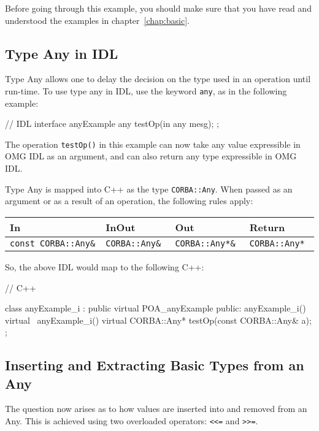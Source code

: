 \documentclass[11pt,oneside,a4paper]{book}
\newcommand{\type}[1]{\texttt{#1}}
\newcommand{\code}[1]{\texttt{#1}}
\newcommand{\op}[1]{\texttt{#1()}}
\begin{document}
Before going through this example, you should make sure that you have
read and understood the examples in chapter~\ref{chap:basic}.

\subsection{Type Any in IDL}
Type Any allows one to delay the decision on the type used in an
operation until run-time. To use type any in IDL, use the keyword
\code{any}, as in the following example:

\begin{idllisting}
// IDL
interface anyExample {
  any testOp(in any mesg);
};
\end{idllisting}


\noindent The operation \op{testOp} in this example can now take any
value expressible in OMG IDL as an argument, and can also return any
type expressible in OMG IDL.

Type Any is mapped into C++ as the type \type{CORBA::Any}. When passed
as an argument or as a result of an operation, the following rules
apply:

\mbox{}

{\small
\begin{tabular}{llll}
{\bf In }                & {\bf InOut }       & {\bf Out }           & 
{\bf Return }                                                   \\ \hline
{\tt const CORBA::Any\& }& {\tt CORBA::Any\& }& {\tt CORBA::Any*\& } & 
{\tt CORBA::Any* }
\end{tabular}
}

\mbox{}

\noindent So, the above IDL would map to the following C++:

\begin{cxxlisting}
// C++

class anyExample_i : public virtual POA_anyExample {
public:
  anyExample_i() { }
  virtual ~anyExample_i() { }
  virtual CORBA::Any* testOp(const CORBA::Any& a);
};
\end{cxxlisting}


\subsection{Inserting and Extracting Basic Types from an Any}

The question now arises as to how values are inserted into and removed
from an Any. This is achieved using two overloaded operators:
\code{<{}<=} and \code{>{}>=}.
\end{document}
